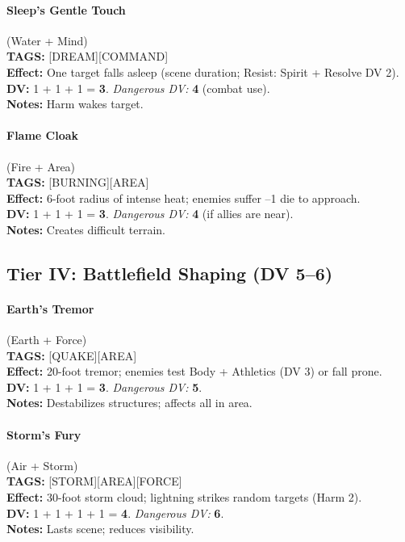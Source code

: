 \paragraph{Sleep's Gentle Touch} (Water + Mind) \\
\textbf{TAGS:} {[DREAM][COMMAND]} \\
\textbf{Effect:} One target falls asleep (scene duration; Resist: Spirit + Resolve DV 2). \\
\textbf{DV:} 1 + 1 + 1 = \textbf{3}. \emph{Dangerous DV:} \textbf{4} (combat use). \\
\textbf{Notes:} Harm wakes target.

\paragraph{Flame Cloak} (Fire + Area) \\
\textbf{TAGS:} {[BURNING][AREA]} \\
\textbf{Effect:} 6-foot radius of intense heat; enemies suffer --1 die to approach. \\
\textbf{DV:} 1 + 1 + 1 = \textbf{3}. \emph{Dangerous DV:} \textbf{4} (if allies are near). \\
\textbf{Notes:} Creates difficult terrain.

\subsection{Tier IV: Battlefield Shaping (DV 5--6)}

\paragraph{Earth's Tremor} (Earth + Force) \\
\textbf{TAGS:} {[QUAKE][AREA]} \\
\textbf{Effect:} 20-foot tremor; enemies test Body + Athletics (DV 3) or fall prone. \\
\textbf{DV:} 1 + 1 + 1 = \textbf{3}. \emph{Dangerous DV:} \textbf{5}. \\
\textbf{Notes:} Destabilizes structures; affects all in area.

\paragraph{Storm's Fury} (Air + Storm) \\
\textbf{TAGS:} {[STORM][AREA][FORCE]} \\
\textbf{Effect:} 30-foot storm cloud; lightning strikes random targets (Harm 2). \\
\textbf{DV:} 1 + 1 + 1 + 1 = \textbf{4}. \emph{Dangerous DV:} \textbf{6}. \\
\textbf{Notes:} Lasts scene; reduces visibility.

